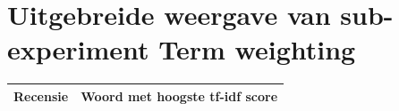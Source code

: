 
\appendix

\chapter{Uitgebreide weergave van sub-experiment Term weighting}\label{bijlage term}

\begin{table}
\centering
\begin{tabu} to \textwidth {|X|X|}
\hline
{\bf Recensie}                                                                                                                                                                                                                                                                                                                                                                                                                                                                                                                                                                                                                                                                                                                                                                                                                                                                                                                                                                                                                                                                                                                                                                                                                                                                                                                                                                                                                                                                                  & {\bf Woord met hoogste tf-idf score} \\ \hline

\end{tabu}
\end{table}
